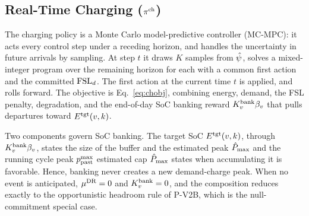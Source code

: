 \subsection{Real-Time Charging ($\pi^{\mathrm{ch}}$)}\label{sec:approach-ch}

The charging policy is a Monte Carlo model-predictive controller (MC-MPC): it acts every control step under a receding horizon, and handles the uncertainty in future arrivals by sampling. At step $t$ it draws $K$ samples from $\hat{\psi}$, solves a mixed-integer program over the remaining horizon for each with a common first action and the committed $\mathrm{FSL}_d$. The first action at the current time $t$ is applied, and rolls forward. The objective is Eq.~\eqref{eq:chobj}, combining energy, demand, the FSL penalty, degradation, and the end-of-day SoC banking reward $K^{\mathrm{bank}}_{v}\beta_{v}$ that pulls departures toward $E^{\mathrm{tgt}}(v,k)$.


\begin{algorithm}[tbph]
\caption{P-V2B Charging Optimization}
\label{alg:MP-MPC}

\end{algorithm}

Two components govern SoC banking. The target SoC $E^{\mathrm{tgt}}(v,k)$, through $K^{\mathrm{bank}}_{v}\beta_{v}$, states the size of the buffer and the  estimated peak $\hat{P}_{\max}$ and the running cycle peak $p^{\max}_{\mathrm{past}}$ estimated cap $\hat{P}_{\max}$ states when accumulating it is favorable. Hence, banking never creates a new demand-charge peak. When no event is anticipated, $\mu^{\mathrm{DR}} = 0$ and $K^{\mathrm{bank}}_{v} = 0$, and the composition reduces exactly to the opportunistic headroom rule of P-V2B, which is the null-commitment special case. 


